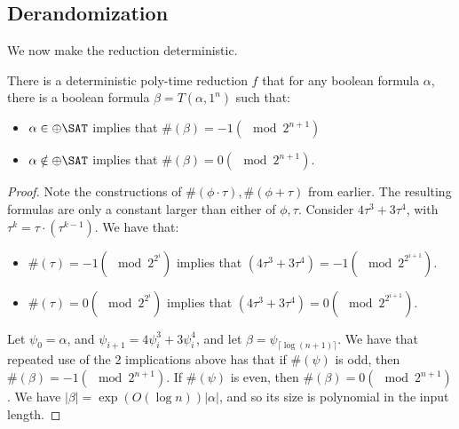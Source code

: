 \subsection*{Derandomization}
We now make the reduction deterministic. 
\begin{lemma}
There is a deterministic poly-time reduction $f$ that for any boolean formula $\alpha$, there is a boolean formula $\beta = T(\alpha, 1^n)$ such that:
\begin{itemize}
\item $\alpha \in \ParitySAT$ implies that $\#(\beta) = -1 (\mod 2^{n+1})$
\item $\alpha \notin \ParitySAT$ implies that $\#(\beta) = 0 (\mod 2^{n+1})$.
\end{itemize}
\end{lemma}
\begin{proof}
Note the constructions of $\#(\phi\cdot\tau), \#(\phi+\tau)$ from earlier. The resulting formulas are only a constant larger than either of $\phi, \tau$. Consider $4\tau^3 + 3\tau^4$, with $\tau^k = \tau \cdot (\tau^{k-1})$. We have that:
\begin{itemize}
\item $\#(\tau) = -1 (\mod 2^{2^i})$ implies that $(4\tau^3 + 3\tau^4) = -1 (\mod 2^{2^{i+1}})$.
\item $\#(\tau) = 0 (\mod 2^{2^i})$ implies that $(4\tau^3 + 3\tau^4) = 0 (\mod 2^{2^{i+1}})$.
\end{itemize}
Let $\psi_0 = \alpha$, and $\psi_{i+1} = 4\psi_i^3 + 3\psi_i^4$, and let $\beta = \psi_{\lceil \log(n+1)\rceil}$. We have that repeated use of the 2 implications above has that if $\#(\psi)$ is odd, then $\#(\beta) = -1 (\mod 2^{n+1})$. If $\#(\psi)$ is even, then $\#(\beta) = 0 (\mod 2^{n+1})$. We have $|\beta| = \exp(O(\log n))|\alpha|$, and so its size is polynomial in the input length.
\end{proof}

